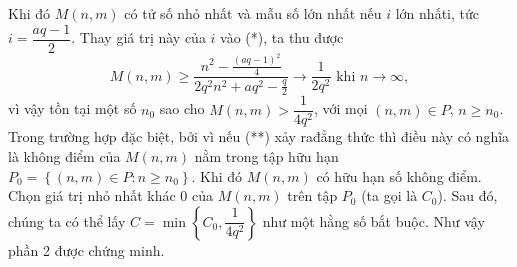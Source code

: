 \begin{ex}
{\begin{enumerate}[1.]
		Khi đó $M(n,m)$ có tử số nhỏ nhất và mẫu số lớn nhất nếu $i$ lớn nhấti, tức $i=\dfrac{aq-1}{2}$. Thay giá trị này của $i$ vào (*), ta thu được
		\[M(n,m)\ge \dfrac{n^2-\frac{(aq-1)^2}{4}}{2q^2n^2+aq^2-\frac{q}{2}}\rightarrow \dfrac{1}{2q^2}\,\, \mbox{khi}\,\, n\rightarrow \infty,\]
	vì vậy tồn tại một số $n_0$ sao cho $M(n,m)>\dfrac{1}{4q^2}$, với mọi $(n,m)\in P$, $n\ge n_0$.  Trong trường hợp đặc biệt, bởi vì nếu (**) xảy rađẳng thức  thì điều này có nghĩa là không điểm của $M(n,m)$ nằm trong tập hữu hạn $P_0=\left\lbrace (n,m)\in P: n\ge n_0\right\rbrace $. Khi đó $M(n,m)$ có hữu hạn số không điểm. Chọn giá trị nhỏ nhất khác $0$ của $M(n,m)$ trên tập $P_0$ (ta gọi là $C_0$).  Sau đó, chúng ta có thể lấy $C=\min\left\lbrace C_0, \dfrac{1}{4q^2} \right\rbrace $ như một hằng số bắt buộc. Như vậy phần 2 được chứng minh.
			
		\end{enumerate}
	}
\end{ex}

